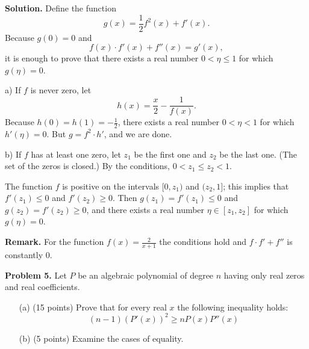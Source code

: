 \documentclass{article}
\begin{document}
\textbf{Solution.} Define the function
\[ g(x) = \frac{1}{2} f^2(x) + f'(x). \]
Because \( g(0) = 0 \) and
\[ f(x) \cdot f'(x) + f''(x) = g'(x), \]
it is enough to prove that there exists a real number \( 0 < \eta \leq 1 \) for which \( g(\eta) = 0 \).

a) If \( f \) is never zero, let
\[ h(x) = \frac{x}{2} - \frac{1}{f(x)}. \]
Because \( h(0) = h(1) = -\frac{1}{2} \), there exists a real number \( 0 < \eta < 1 \) for which \( h'(\eta) = 0 \). But \( g = f^2 \cdot h' \), and we are done.

b) If \( f \) has at least one zero, let \( z_1 \) be the first one and \( z_2 \) be the last one. (The set of the zeros is closed.) By the conditions, \( 0 < z_1 \leq z_2 < 1 \).

The function \( f \) is positive on the intervals \( [0, z_1) \) and \( (z_2, 1] \); this implies that \( f'(z_1) \leq 0 \) and \( f'(z_2) \geq 0 \). Then \( g(z_1) = f'(z_1) \leq 0 \) and \( g(z_2) = f'(z_2) \geq 0 \), and there exists a real number \( \eta \in [z_1, z_2] \) for which \( g(\eta) = 0 \).

\textbf{Remark.} For the function \( f(x) = \frac{2}{x+1} \) the conditions hold and \( f \cdot f' + f'' \) is constantly 0.

\textbf{Problem 5.}
Let \( P \) be an algebraic polynomial of degree \( n \) having only real zeros and real coefficients.

\begin{enumerate}
    \item[(a)] (15 points) Prove that for every real \( x \) the following inequality holds:
    \begin{equation}
        (n - 1)\left({P'(x)}\right)^2 \geq n{P(x)}{P''(x)}
    \end{equation}
    \item[(b)] (5 points) Examine the cases of equality.
\end{enumerate}
\end{document}
